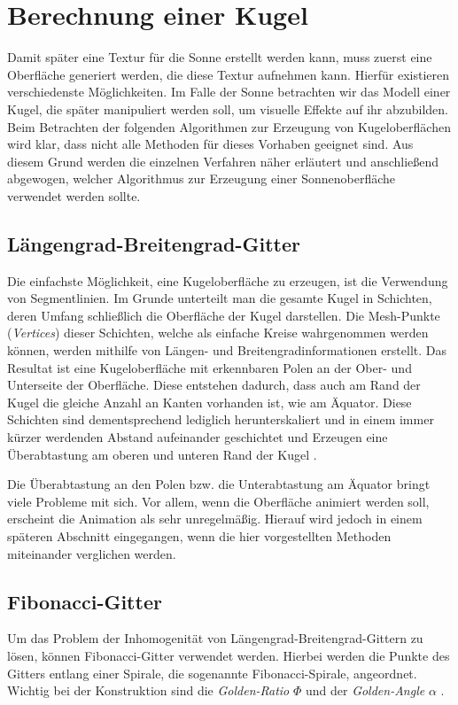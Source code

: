 \section{Berechnung einer Kugel}
Damit später eine Textur für die Sonne erstellt werden kann, muss zuerst eine
Oberfläche generiert werden, die diese Textur aufnehmen kann. Hierfür existieren
verschiedenste Möglichkeiten. Im Falle der Sonne betrachten wir das Modell einer
Kugel, die später manipuliert werden soll, um visuelle Effekte auf ihr
abzubilden. Beim Betrachten der folgenden Algorithmen zur Erzeugung von
Kugeloberflächen wird klar, dass nicht alle Methoden für dieses Vorhaben
geeignet sind. Aus diesem Grund werden die einzelnen Verfahren näher erläutert
und anschließend abgewogen, welcher Algorithmus zur Erzeugung einer
Sonnenoberfläche verwendet werden sollte.

\subsection{Längengrad-Breitengrad-Gitter}
Die einfachste Möglichkeit, eine Kugeloberfläche zu erzeugen, ist die Verwendung
von Segmentlinien. Im Grunde unterteilt man die gesamte Kugel in Schichten,
deren Umfang schließlich die Oberfläche der Kugel darstellen. Die Mesh-Punkte
(\textit{Vertices}) dieser Schichten, welche als einfache Kreise wahrgenommen
werden können, werden mithilfe von Längen- und Breitengradinformationen
erstellt. Das Resultat ist eine Kugeloberfläche mit erkennbaren Polen an der
Ober- und Unterseite der Oberfläche. Diese entstehen dadurch, dass auch am Rand
der Kugel die gleiche Anzahl an Kanten vorhanden ist, wie am Äquator. Diese
Schichten sind dementsprechend lediglich herunterskaliert und in einem immer
kürzer werdenden Abstand aufeinander geschichtet und Erzeugen eine Überabtastung
am oberen und unteren Rand der Kugel \cite{Gonzalez2009}.

Die Überabtastung an den Polen bzw. die Unterabtastung am Äquator bringt viele
Probleme mit sich. Vor allem, wenn die Oberfläche animiert werden soll,
erscheint die Animation als sehr unregelmäßig. Hierauf wird jedoch in einem
späteren Abschnitt eingegangen, wenn die hier vorgestellten Methoden miteinander
verglichen werden.

\subsection{Fibonacci-Gitter}
Um das Problem der Inhomogenität von Längengrad-Breitengrad-Gittern zu lösen,
können Fibonacci-Gitter verwendet werden. Hierbei werden die Punkte des Gitters
entlang einer Spirale, die sogenannte Fibonacci-Spirale, angeordnet. Wichtig bei
der Konstruktion sind die \textit{Golden-Ratio} $\Phi$ und der
\textit{Golden-Angle} $\alpha$ \cite{Gonzalez2009}.

